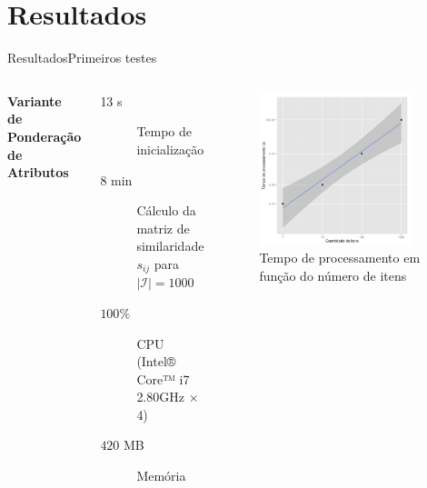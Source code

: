 \section[Resultados]{Resultados}

\begin{frame}{Resultados}{Primeiros testes}
\begin{columns}[c]
\textbf{Variante de Ponderação de Atributos}
\begin{description}
	\item[13 s] Tempo de inicialização
	\item[8 min] Cálculo da matriz de similaridade $s_{ij}$ para $\left|\mathcal{I}\right| = 1000$
	\item[$100 \%$] CPU (Intel® Core™ i7 2.80GHz $\times$ 4)
	\item[$420$ MB] Memória 
\end{description}	
\begin{figure}[ht]
    \begin{center}
    \includegraphics[width=0.9\textwidth]{img/ixt}
    \end{center}
\caption{Tempo de processamento em função do número de itens}
\end{figure}
\end{columns}
\end{frame}


